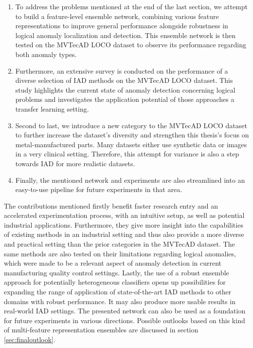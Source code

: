 \begin{enumerate}
\item To address the problems mentioned at the end of the last section, we attempt 
to build a feature-level ensemble network, combining various feature representations to improve 
general performance alongside robustness in logical anomaly localization and detection. This ensemble network is then tested on 
the MVTecAD LOCO dataset to observe its performance regarding both anomaly types.
\item Furthermore, an extensive survey is conducted on the performance of a diverse selection of IAD methods on the MVTecAD LOCO dataset. 
This study highlights the current state of anomaly detection concerning logical problems and investigates the application potential of 
those approaches a transfer learning setting.
\item Second to last, we introduce a new category to the MVTecAD LOCO dataset to further increase the dataset's diversity and strengthen this thesis's focus on metal-manufactured parts. Many datasets either use synthetic data or images in a very clinical setting. Therefore, this 
attempt for variance is also a step towards IAD for more realistic datasets.
\item Finally, the mentioned network and experiments are also streamlined into an easy-to-use pipeline 
for future experiments in that area.
\end{enumerate}

The contributions mentioned firstly benefit faster research entry and an accelerated experimentation process, with an intuitive setup, 
as well as potential industrial applications. 
Furthermore, they give more insight into the capabilities of existing methods in an industrial setting and thus also provide a more 
diverse and practical setting than the prior categories in the MVTecAD \cite{LOCODentsAndScratchesBergmann2022} dataset. The same methods are also tested on their limitations 
regarding logical anomalies, which were made to be a relevant aspect of anomaly detection in current manufacturing quality control 
settings. Lastly, the use of a robust ensemble approach for potentially heterogeneous classifiers opens up possibilities for expanding 
the range of application of state-of-the-art IAD methods to other domains with robust performance. It may also produce more usable results in real-world IAD settings. The presented network can also be used as a foundation for future experiments in 
various directions. Possible outlooks based on this kind of multi-feature representation ensembles are discussed in section \ref{sec:finaloutlook}.
\newline
\newline


